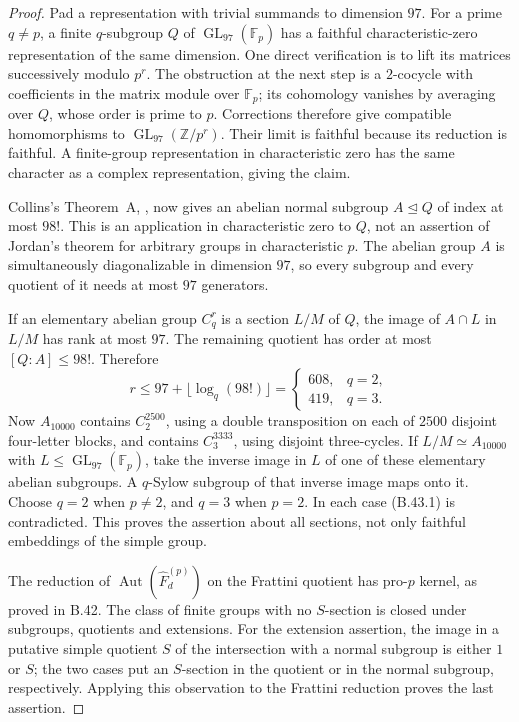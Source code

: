 \begin{proof}
Pad a representation with trivial summands
to dimension $97$.  For a prime $q\ne p$,
a finite $q$-subgroup $Q$ of
$\operatorname{GL}_{97}(\mathbb F_p)$ has
a faithful characteristic-zero representation
of the same dimension.  One direct verification
is to lift its matrices successively modulo
$p^r$.  The obstruction at the next step is
a $2$-cocycle with coefficients in the
matrix module over $\mathbb F_p$; its
cohomology vanishes by averaging over $Q$,
whose order is prime to $p$.  Corrections
therefore give compatible homomorphisms
to $\operatorname{GL}_{97}(\mathbb Z/p^r)$.
Their limit is faithful because its reduction
is faithful.  A finite-group representation
in characteristic zero has the same character
as a complex representation, giving the claim.

Collins's Theorem~A, \cite{CECollinsJordan2007},
now gives an abelian normal subgroup
$A\trianglelefteq Q$ of index at most $98!$.
This is an application in characteristic
zero to $Q$, not an assertion of Jordan's
theorem for arbitrary groups in
characteristic $p$.  The abelian group
$A$ is simultaneously diagonalizable
in dimension $97$, so every subgroup
and every quotient of it needs at most
$97$ generators.

If an elementary abelian group $C_q^r$
is a section $L/M$ of $Q$, the image
of $A\cap L$ in $L/M$ has rank at most
$97$.  The remaining quotient has order
at most $[Q:A]\leq98!$.  Therefore
\[
 r\leq97+\lfloor\log_q(98!)\rfloor
   =\begin{cases}608,&q=2,\\419,&q=3.\end{cases}            \tag{B.43.1}
\]
Now $A_{10000}$ contains $C_2^{2500}$,
using a double transposition on each
of $2500$ disjoint four-letter blocks,
and contains $C_3^{3333}$, using
disjoint three-cycles.  If
$L/M\simeq A_{10000}$ with
$L\leq\operatorname{GL}_{97}(\mathbb F_p)$,
take the inverse image in $L$ of one
of these elementary abelian subgroups.
A $q$-Sylow subgroup of that inverse
image maps onto it.  Choose $q=2$
when $p\ne2$, and $q=3$ when $p=2$.
In each case (B.43.1) is contradicted.
This proves the assertion about all
sections, not only faithful embeddings
of the simple group.

The reduction of
$\operatorname{Aut}(\widehat F_d^{(p)})$
on the Frattini quotient has pro-$p$
kernel, as proved in B.42.  The class
of finite groups with no $S$-section
is closed under subgroups, quotients
and extensions.  For the extension
assertion, the image in a putative
simple quotient $S$ of the intersection
with a normal subgroup is either $1$
or $S$; the two cases put an $S$-section
in the quotient or in the normal
subgroup, respectively.  Applying
this observation to the Frattini
reduction proves the last assertion.
\end{proof}

